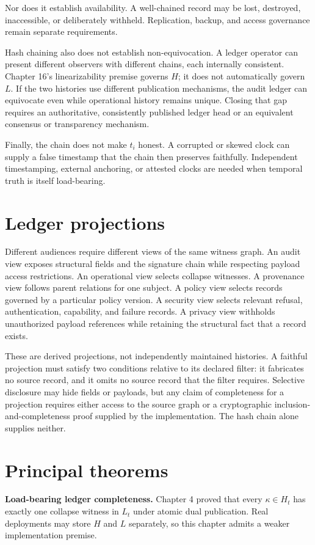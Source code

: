 \documentclass[11pt,openany]{book}
\begin{document}
Nor does it establish availability. A well-chained record may be lost,
destroyed, inaccessible, or deliberately withheld. Replication, backup, and
access governance remain separate requirements.

Hash chaining also does not establish non-equivocation. A ledger operator can
present different observers with different chains, each internally consistent.
Chapter 16's linearizability premise governs \(H\); it does not automatically
govern \(L\). If the two histories use different publication mechanisms, the
audit ledger can equivocate even while operational history remains unique.
Closing that gap requires an authoritative, consistently published ledger head
or an equivalent consensus or transparency mechanism.

Finally, the chain does not make \(t_i\) honest. A corrupted or skewed clock
can supply a false timestamp that the chain then preserves faithfully.
Independent timestamping, external anchoring, or attested clocks are needed
when temporal truth is itself load-bearing.

\section{Ledger projections}
Different audiences require different views of the same witness graph. An
audit view exposes structural fields and the signature chain while respecting
payload access restrictions. An operational view selects collapse witnesses.
A provenance view follows parent relations for one subject. A policy view
selects records governed by a particular policy version. A security view
selects relevant refusal, authentication, capability, and failure records. A
privacy view withholds unauthorized payload references while retaining the
structural fact that a record exists.

These are derived projections, not independently maintained histories. A
faithful projection must satisfy two conditions relative to its declared
filter: it fabricates no source record, and it omits no source record that the
filter requires. Selective disclosure may hide fields or payloads, but any
claim of completeness for a projection requires either access to the source
graph or a cryptographic inclusion-and-completeness proof supplied by the
implementation. The hash chain alone supplies neither.

\section{Principal theorems}
\textbf{Load-bearing ledger completeness.} Chapter 4 proved that every
\(\kappa\in H_t\) has exactly one collapse witness in \(L_t\) under atomic dual
publication. Real deployments may store \(H\) and \(L\) separately, so this
chapter admits a weaker implementation premise.
\end{document}
